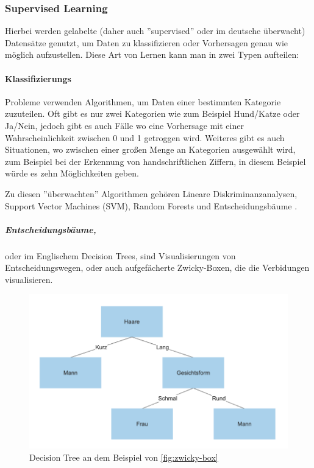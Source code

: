 \subsubsection{Supervised Learning}

Hierbei werden gelabelte (daher auch ''supervised'' oder im deutsche überwacht) Datensätze genutzt, um Daten zu klassifizieren oder Vorhersagen genau wie möglich aufzustellen. Diese Art von Lernen kann man in zwei Typen aufteilen:

\paragraph{Klassifizierungs} Probleme verwenden Algorithmen, um Daten einer bestimmten Kategorie zuzuteilen. Oft gibt es nur zwei Kategorien wie zum Beispiel Hund/Katze oder Ja/Nein, jedoch gibt es auch Fälle wo eine Vorhersage mit einer Wahrscheinlichkeit zwischen 0 und 1 getroggen wird. Weiteres gibt es auch Situationen, wo zwischen einer großen Menge an Kategorien ausgewählt wird, zum Beispiel bei der Erkennung von handschriftlichen Ziffern, in diesem Beispiel würde es zehn Möglichkeiten geben.

Zu diesen ''überwachten'' Algorithmen gehören Lineare Diskriminanzanalysen, Support Vector Machines (SVM), Random Forests und Entscheidungsbäume \cite{SL:online}.

\subparagraph{Entscheidungsbäume,} oder im Englischem Decision Trees, sind Visualisierungen von Entscheidungswegen, oder auch aufgefächerte Zwicky-Boxen, die die Verbidungen visualisieren.

\begin{figure}[ht]
    \centering
    \includegraphics[scale=0.4]{sections/machine-learning/images/decision-tree.png}
    \caption{Decision Tree an dem Beispiel von \ref{fig:zwicky-box}}
\end{figure}

